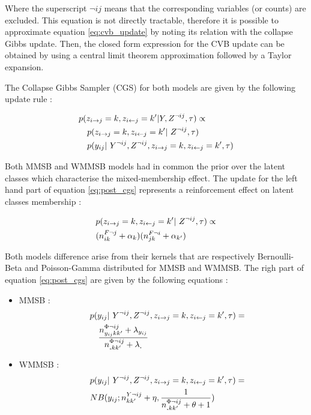 Where the superscript $\neg ij$ means that the corresponding variables (or counts) are excluded.
This equation is not directly tractable, therefore it is possible to approximate equation \eqref{eq:cvb_update} by noting its relation with the collapse Gibbs update. Then,  the closed form expression for the CVB update can be obtained by using a central limit theorem approximation followed by a Taylor expansion.

The Collapse Gibbs Sampler (CGS) for both models are given by the following update rule :

\begin{align} \label{eq:post_cgs}
    &p(\zij=k, \zji=k' | Y, Z^{\neg ij}, \tau) \propto  \nonumber\\
    & \quad p(\zij=k, \zji=k' | Z^{\neg ij}, \tau) \nonumber \\
    & \quad p(y_{ij} | Y^{\neg ij}, Z^{\neg ij}, \zij=k, \zji=k', \tau)
\end{align}

Both MMSB and WMMSB models had in common the prior over the latent classes which characterise the mixed-membership effect. The update for the left hand part of equation \eqref{eq:post_cgs} represents a reinforcement effect on latent classes membership :

\begin{align}
    & p(\zij=k, \zji=k' | Z^{\neg ij}, \tau) \propto  \nonumber\\
    & (n^{F\neg j}_{ik} + \alpha_k) (n^{F\neg i}_{jk} + \alpha_{k'}) 
\end{align}


Both models difference arise from their kernels that are respectively Bernoulli-Beta and Poisson-Gamma distributed for MMSB and WMMSB. The righ part of equation \eqref{eq:post_cgs} are given by the following equations :

\begin{itemize}
    \item MMSB : {\setlength{\mathindent}{0cm} \begin{align} \quad & p(y_{ij} | Y^{\neg ij}, Z^{\neg ij}, \zij=k, \zji=k', \tau) = \nonumber \\ & \quad  \frac{ n^{\Phi\neg ij}_{y_{ij}kk'} + \lambda_{y_{ij}}}{n^{\Phi\neg ij}_{\bm{.}kk'} + \lambda_{\bm{.}}}\end{align}}
        \item WMMSB : {\setlength{\mathindent}{0cm} \begin{align} &\quad p(y_{ij} | Y^{\neg ij}, Z^{\neg ij}, \zij=k, \zji=k', \tau) = \nonumber\\& \quad  NB(y_{ij}; n^{Y\neg ij}_{kk'} + \eta, \frac{1}{n^{\Phi\neg ij}_{\bm{.}kk'} + \theta + 1} )\end{align}}
\end{itemize}

